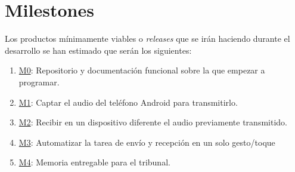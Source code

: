 \section{Milestones}
Los productos mínimamente viables o \emph{releases} que se irán haciendo durante el
desarrollo se han estimado que serán los siguientes:

\begin{enumerate}
    \item \href{https://github.com/migueorg/One-touch-music-streaming-TFG-ETSIIT/milestone/1}{M0}: Repositorio y documentación funcional sobre la que empezar a programar.
    \item \href{https://github.com/migueorg/One-touch-music-streaming-TFG-ETSIIT/milestone/2}{M1}: Captar el audio del teléfono Android para transmitirlo.
    \item \href{https://github.com/migueorg/One-touch-music-streaming-TFG-ETSIIT/milestone/3}{M2}: Recibir en un dispositivo diferente el audio previamente transmitido.
    \item \href{https://github.com/migueorg/One-touch-music-streaming-TFG-ETSIIT/milestone/4}{M3}: Automatizar la tarea de envío y recepción en un solo gesto/toque
    \item \href{https://github.com/migueorg/One-touch-music-streaming-TFG-ETSIIT/milestone/5}{M4}: Memoria entregable para el tribunal.
\end{enumerate}